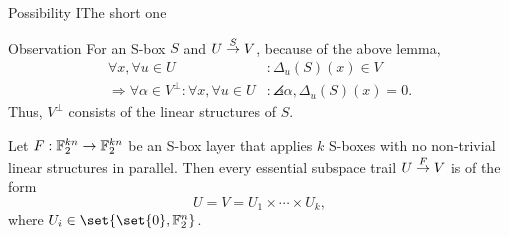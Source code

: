 \begin{frame}{Possibility I}{The short one}
    \begin{block}{Observation}
        \vspace{0.25em}
        For an S-box $S$ and $U \stackrel{S}{\rightarrow} V$, because of the above lemma,
        \begin{align*}
            \forall x, \forall u \in U&: \Delta_u(S)(x) \in V \\
            \Rightarrow \forall \alpha \in V^\perp : \forall x, \forall u \in U &: \angles{\alpha, \Delta_u(S)(x)} = 0.
        \end{align*}
        Thus, $V^\perp$ consists of the linear structures of $S$.
    \end{block}
    \begin{theorem}
        Let $F : \mathbb{F}_2^{kn} \to \mathbb{F}_2^{kn}$ be an S-box layer that applies $k$ S-boxes with no non-trivial linear structures in parallel.
        Then every essential subspace trail $U \stackrel{F}{\rightarrow} V$ is of the form
        \begin{equation*}
            U = V = U_1 \times \cdots \times U_k,
        \end{equation*}
        where $U_i \in \set{\set{0}, \F_2^n}$.
    \end{theorem}
\end{frame}

